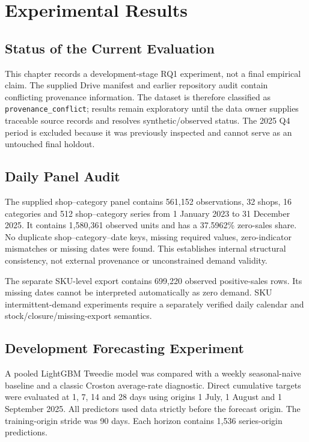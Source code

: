 \chapter{Experimental Results}
\label{chapter_experimentalResults}
\section{Status of the Current Evaluation}
This chapter records a development-stage RQ1 experiment, not a final empirical
claim. The supplied Drive manifest and earlier repository audit contain
conflicting provenance information. The dataset is therefore classified as
\texttt{provenance\_conflict}; results remain exploratory until the data owner
supplies traceable source records and resolves synthetic/observed status.
The 2025 Q4 period is excluded because it was previously inspected and cannot
serve as an untouched final holdout.

\section{Daily Panel Audit}
The supplied shop--category panel contains 561,152 observations, 32 shops,
16 categories and 512 shop--category series from 1 January 2023 to
31 December 2025. It contains 1,580,361 observed units and has a 37.5962\%
zero-sales share. No duplicate shop--category--date keys, missing required
values, zero-indicator mismatches or missing dates were found. This establishes
internal structural consistency, not external provenance or unconstrained
demand validity.

The separate SKU-level export contains 699,220 observed positive-sales rows.
Its missing dates cannot be interpreted automatically as zero demand. SKU
intermittent-demand experiments require a separately verified daily calendar
and stock/closure/missing-export semantics.

\section{Development Forecasting Experiment}
A pooled LightGBM Tweedie model was compared with a weekly seasonal-naive
baseline and a classic Croston average-rate diagnostic. Direct cumulative
targets were evaluated at 1, 7, 14 and 28 days using origins 1 July,
1 August and 1 September 2025. All predictors used data strictly before the
forecast origin. The training-origin stride was 90 days. Each horizon contains
1,536 series-origin predictions.

